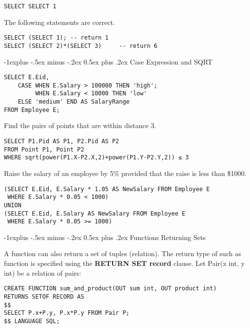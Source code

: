 \documentclass[10pt,landscape]{article}
\makeatletter
\newcommand{\sql}[1]{{\color{cyan} \textbf{#1}}}
\renewcommand{\subsection}{\@startsection{subsection}{2}{0mm}%
                                {-1explus -.5ex minus -.2ex}%
                                {0.5ex plus .2ex}%
                                {\normalfont\normalsize\bfseries}}
\makeatother
\begin{document}
\begin{multicols}{4}
\begin{lstlisting}
SELECT SELECT 1	
\end{lstlisting}

The following statements are correct.

\begin{lstlisting}
SELECT (SELECT 1); -- return 1
SELECT (SELECT 2)*(SELECT 3)	 -- return 6
\end{lstlisting}

\subsection{Case Expression and SQRT}

\begin{lstlisting}
SELECT E.Eid,
    CASE WHEN E.Salary > 100000 THEN 'high';
         WHEN E.Salary < 10000 THEN 'low'
    ELSE 'medium' END AS SalaryRange
FROM Employee E;
\end{lstlisting}

Find the pairs of points that are within distance 3.

\begin{lstlisting}
SELECT P1.Pid AS P1, P2.Pid AS P2
FROM Point P1, Point P2
WHERE sqrt(power(P1.X-P2.X,2)+power(P1.Y-P2.Y,2)) ≤ 3
\end{lstlisting}

Raise the salary of an employee by 5\% provided that the raise is less than \$1000.

\begin{lstlisting}
(SELECT E.Eid, E.Salary * 1.05 AS NewSalary FROM Employee E
 WHERE E.Salary * 0.05 < 1000)
UNION
(SELECT E.Eid, E.Salary AS NewSalary FROM Employee E
 WHERE E.Salary * 0.05 >= 1000)
\end{lstlisting}

\subsection{Functions Returning Sets}

A function can also return a set of tuples (relation). The return type of such as function is specified using the \sql{RETURN SET record} clause. Let Pair(x int, y int) be a relation of pairs:

\begin{lstlisting}
CREATE FUNCTION sum_and_product(OUT sum int, OUT product int)
RETURNS SETOF RECORD AS 
$$
SELECT P.x+P.y, P.x*P.y FROM Pair P;
$$ LANGUAGE SQL;
\end{lstlisting}


\end{multicols}
\end{document}
